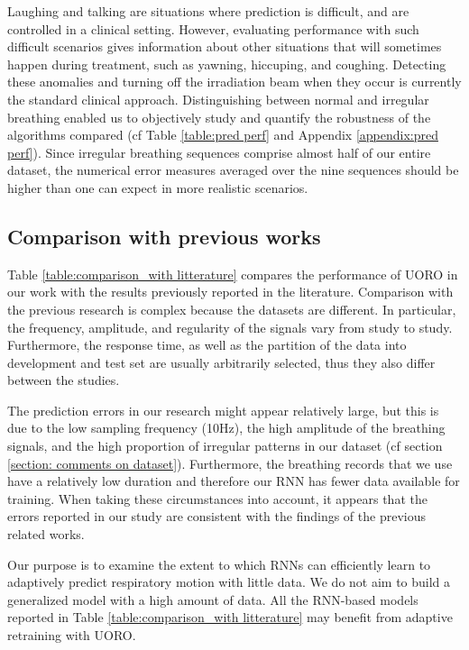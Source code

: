 \documentclass[twocolumn,a4paper]{svjour3} \sloppy          \smartqed
\begin{document}
Laughing and talking are situations where prediction is difficult, and are controlled in a clinical setting. However, evaluating performance with such difficult scenarios gives information about other situations that will sometimes happen during treatment, such as yawning, hiccuping, and coughing. Detecting these anomalies and turning off the irradiation beam when they occur is currently the standard clinical approach. Distinguishing between normal and irregular breathing enabled us to objectively study and quantify the robustness of the algorithms compared (cf Table \ref{table:pred perf} and Appendix \ref{appendix:pred perf}). Since irregular breathing sequences comprise almost half of our entire dataset, the numerical error measures averaged over the nine sequences should be higher than one can expect in more realistic scenarios. 


\subsection{Comparison with previous works}


Table \ref{table:comparison_with litterature} compares the performance of UORO in our work with the results previously reported in the literature. Comparison with the previous research is complex because the datasets are different. In particular, the frequency, amplitude, and regularity of the signals vary from study to study. Furthermore, the response time, as well as the partition of the data into development and test set are usually arbitrarily selected, thus they also differ between the studies. 

The prediction errors in our research might appear relatively large, but this is due to the low sampling frequency (10Hz), the high amplitude of the breathing signals, and the high proportion of irregular patterns in our dataset (cf section \ref{section: comments on dataset}). Furthermore, the breathing records that we use have a relatively low duration and therefore our RNN has fewer data available for training. When taking these circumstances into account, it appears that the errors reported in our study are consistent with the findings of the previous related works.

Our purpose is to examine the extent to which RNNs can efficiently learn to adaptively predict respiratory motion with little data. We do not aim to build a generalized model with a high amount of data. All the RNN-based models reported in Table \ref{table:comparison_with litterature} may benefit from adaptive retraining with UORO.
\end{document}
